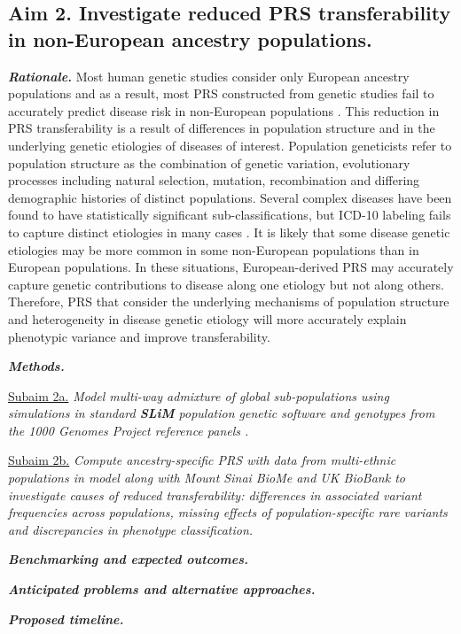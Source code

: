\documentclass[11pt]{article}  %
\newlength\tindent
\renewcommand{\indent}{\hspace*{\tindent}}
\begin{document}
\subsection*{Aim 2. Investigate reduced PRS transferability in non-European ancestry populations.}

\indent \textbf{\textit{Rationale.}} Most human genetic studies consider only European ancestry populations and as a result, most PRS constructed from genetic studies fail to accurately predict disease risk in non-European populations \cite{wojcik_genetic_2019}. This reduction in PRS transferability is a result of differences in population structure and in the underlying genetic etiologies of diseases of interest. Population geneticists refer to population structure as the combination of genetic variation, evolutionary processes including natural selection, mutation, recombination and differing demographic histories of distinct populations. Several complex diseases have been found to have statistically significant sub-classifications, but ICD-10 labeling fails to capture distinct etiologies in many cases \cite{???}. It is likely that some disease genetic etiologies may be more common in some non-European populations than in European populations. In these situations, European-derived PRS may accurately capture genetic contributions to disease along one etiology but not along others. Therefore, PRS that consider the underlying mechanisms of population structure and heterogeneity in disease genetic etiology will more accurately explain phenotypic variance and improve transferability.         


\indent \textbf{\textit{Methods.}} 

\indent \underline{Subaim 2a.} \textit{Model multi-way admixture of global sub-populations using simulations in standard \textbf{SLiM} population genetic software \cite{haller_slim_2019} and genotypes from the 1000 Genomes Project reference panels \cite{noauthor_global_2015}.} 

\indent \underline{Subaim 2b.} \textit{Compute ancestry-specific PRS with data from multi-ethnic populations in model along with Mount Sinai BioMe and UK BioBank to investigate causes of reduced transferability: differences in associated variant frequencies across populations, missing effects of population-specific rare variants and discrepancies in phenotype classification.} 

\indent \textbf{\textit{Benchmarking and expected outcomes.}}


\indent \textbf{\textit{Anticipated problems and alternative approaches.}}


\textbf{\textit{Proposed timeline.}}






\newpage

\end{document}
